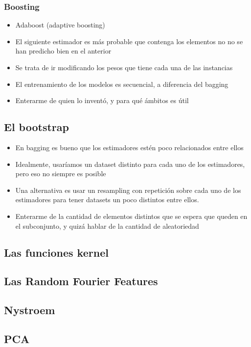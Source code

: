 \documentclass{article}
\begin{document}
        \subsubsection{Boosting}
\begin{itemize}
    \item Adaboost (adaptive boosting)
    \item El siguiente estimador es más probable que contenga los elementos no
    no se han predicho bien en el anterior
    \item Se trata de ir modificando los pesos que tiene cada una de las instancias
    \item El entrenamiento de los modelos es secuencial, a diferencia del bagging
    \item Enterarme de quien lo inventó, y para qué ámbitos es útil
\end{itemize}
    \subsection{El bootstrap}
    \begin{itemize}
\item En bagging es bueno que los estimadores estén poco relacionados
entre ellos
\item Idealmente, usaríamos un dataset distinto para cada uno de los
estimadores, pero eso no siempre es posible
\item Una alternativa es usar un resampling con repetición sobre cada
uno de los estimadores para tener datasets un poco distintos entre ellos.
\item Enterarme de la cantidad de elementos distintos que se espera que queden
en el subconjunto, y quizá hablar de la cantidad de aleatoriedad
    \end{itemize}
    \subsection{Las funciones kernel}
    \subsection{Las Random Fourier Features}
    \subsection{Nystroem}
    \subsection{PCA}
\end{document}
